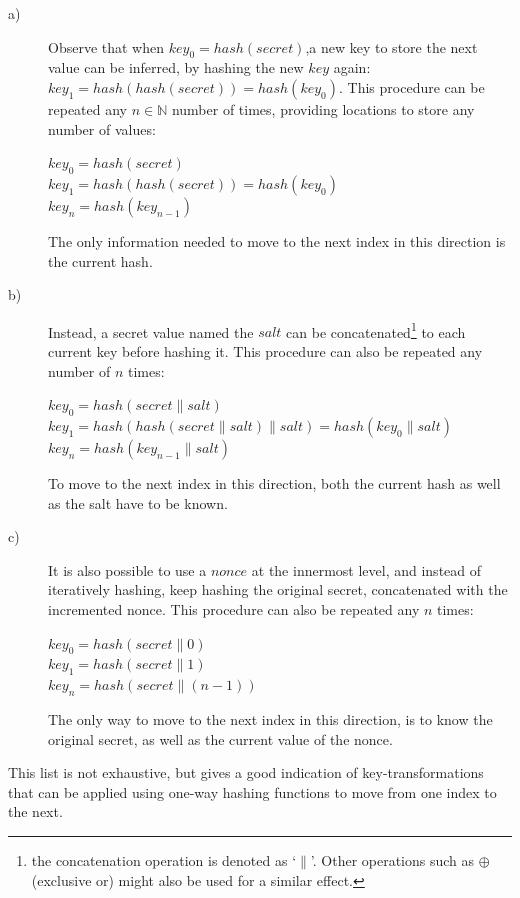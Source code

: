 \documentclass[a4paper]{article}
\begin{document}
\begin{description}
	

	\item[a)] Observe that when  $key_0 = hash(secret)$,a new key to store the next value can be inferred, by hashing the new $key$ again: $key_1 = hash(hash(secret)) = hash(key_0)$. This procedure can be repeated any $n \in \mathbb{N}$ number of times, providing locations to store any number of values: 
	
	$key_0 = hash(secret)$\\
	$key_1 = hash(hash(secret)) = hash(key_0)$\\
	$key_n = hash(key_{n-1})$
	
	The only information needed to move to the next index in this direction is the current hash.
	
	
	\item[b)] Instead, a secret value named the $salt$ can be concatenated\footnote{the concatenation operation is denoted as `$\parallel$'. Other operations such as $\oplus$ (exclusive or) might also be used for a similar effect.} to each current key before hashing it. This procedure can also be repeated any number of $n$ times: 
	
   	$key_0 = hash(secret \parallel salt)$ \\	
	$key_1 = hash(hash(secret \parallel salt) \parallel salt) = hash(key_0\parallel salt)$\\
	$key_n = hash(key_{n-1} \parallel salt)$	 
	
	To move to the next index in this direction, both the current hash as well as the salt have to be known.
	 
	\item[c)] It is also possible to use a $nonce$ at the innermost level, and instead of iteratively hashing, keep hashing the original secret, concatenated with the incremented nonce. This procedure can also be repeated any $n$ times:
	
	$key_0 = hash(secret \parallel 0)$ \\
	$key_1 = hash(secret \parallel 1)$ \\
	$key_n = hash(secret \parallel (n-1))$
	
	The only way to move to the next index in this direction, is to know the original secret, as well as the current value of the nonce.

\end{description}

This list is not exhaustive, but gives a good indication of key-transformations that can be applied using one-way hashing functions to move from one index to the next. 
\end{document}
